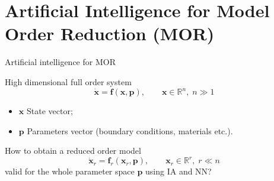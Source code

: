 \documentclass{beamer}
\begin{document}
\section{Artificial Intelligence for Model Order Reduction (MOR)}

\begin{frame}{Artificial intelligence for MOR}


High dimensional full order system
\begin{equation*}
	\dot{\mathbf{x}} = \mathbf{f}(\mathbf{x}, \mathbf{p}), \qquad \mathbf{x} \in \mathbb{R}^n, \; n \gg 1
\end{equation*}
\begin{itemize}
	\item $\mathbf{x}$ State vector;
	\item $\mathbf{p}$ Parameters vector (boundary conditions, materials etc.).
\end{itemize}
How to obtain a reduced order model
\begin{equation*}
	\dot{\mathbf{x}}_r = \mathbf{f}_r(\mathbf{x}_r, \mathbf{p}), \qquad \mathbf{x}_r \in \mathbb{R}^r, \; r \ll n
\end{equation*}
valid for the whole parameter space $\mathbf{p}$ using IA and NN?

\end{frame}
\end{document}
